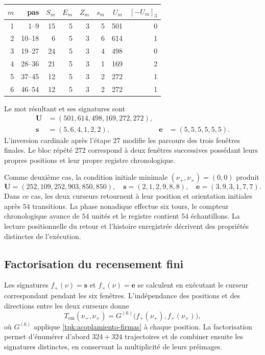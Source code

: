\begin{tablacompleta}[htbp]
\caption{Les six fenêtres de la condition initiale \((16,84)\).}
\label{tpk:tabla-seis501}
\begin{tabular}{@{}rrrrrrrr@{}}
\toprule
\(m\)&pas&\(S_m\)&\(E_m\)&\(Z_m\)&\(s_m\)&\(U_m\)&\([-U_m]_3\)\\
\midrule
1&1--9&15&5&3&5&501&0\\
2&10--18&6&5&3&6&614&1\\
3&19--27&24&5&3&4&498&0\\
4&28--36&21&5&3&1&169&2\\
5&37--45&12&5&3&2&272&1\\
6&46--54&12&5&3&2&272&1\\
\bottomrule
\end{tabular}
\end{tablacompleta}

Le mot résultant et ses signatures sont
\begin{align*}
 \mathbf U&=(501,614,498,169,272,272),\\
 \mathbf s&=(5,6,4,1,2,2),&
 \mathbf e&=(5,5,5,5,5,5).
\end{align*}
L'inversion cardinale après l'étape \(27\) modifie les parcours des
trois fenêtres finales. Le bloc répété \(272\) correspond à deux
fenêtres successives possédant leurs propres positions et leur propre registre chronologique.

Comme deuxième cas, la condition initiale minimale \((\nu_+,\nu_\times)=(0,0)\)
produit
\[
 \mathbf U=(252,109,252,903,850,850),\quad
 \mathbf s=(2,1,2,9,8,8),\quad
 \mathbf e=(3,9,3,1,7,7).
\]
Dans ce cas, les deux curseurs retournent à leur position et orientation initiales
après \(54\) transitions. La phase nonadique effectue six tours, le
compteur chronologique avance de \(54\) unités et le registre contient
\(54\) échantillons. La lecture positionnelle du retour et
l'histoire enregistrée décrivent des propriétés distinctes de l'exécution.

\subsection{Factorisation du recensement fini}
\label{tpk:censo}

Les signatures \(f_+(\nu)=\mathbf s\) et \(f_\times(\nu)=\mathbf e\) se
calculent en exécutant le curseur correspondant pendant les six fenêtres.
L'indépendance des positions et des directions entre les deux curseurs donne
\begin{equation}
 T_{\mathrm{em}}(\nu_+,\nu_\times)
   =G^{(6)}\bigl(f_+(\nu_+),f_\times(\nu_\times)\bigr),
 \label{tpk:factorizacion}
\end{equation}
où \(G^{(6)}\) applique \eqref{tpk:acoplamiento-firmas} à chaque position.
La factorisation permet d'énumérer d'abord \(324+324\) trajectoires et
de combiner ensuite les signatures distinctes, en conservant la multiplicité de
leurs préimages.

